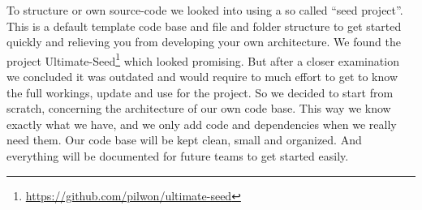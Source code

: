 
To structure or own \gls{source-code}
we looked into using a so called ``seed project''.
This is a default template code base and file and folder structure
to get started quickly and relieving you from developing your own architecture.
We found the project
Ultimate-Seed\footnote{\url{https://github.com/pilwon/ultimate-seed}}
which looked promising.
But after a closer examination we concluded it was outdated
and would require to much effort to get to know the full workings,
update and use for the \gls{project}.
So we decided to start from scratch,
concerning the architecture of our own code base.
This way we know exactly what we have,
and we only add code and dependencies when we really need them.
Our code base will be kept clean, small and organized.
And everything will be documented for future teams to get started easily.
